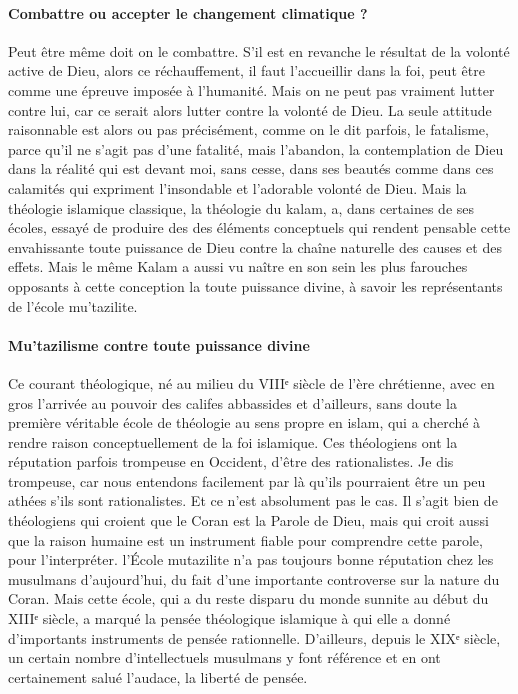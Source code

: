 \paragraph{Combattre ou accepter le changement climatique ?}
Peut être même doit on le combattre. S'il est en revanche le résultat de la volonté active de Dieu, alors ce réchauffement, il faut l'accueillir dans la foi, peut être comme une épreuve imposée à l'humanité. Mais on ne peut pas vraiment lutter contre lui, car ce serait alors lutter contre la volonté de Dieu. La seule attitude raisonnable est alors ou pas précisément, comme on le dit parfois, le fatalisme, parce qu'il ne s'agit pas d'une fatalité, mais l'abandon, la contemplation de Dieu dans la réalité qui est devant moi, sans cesse, dans ses beautés comme dans ces calamités qui expriment l'insondable et l'adorable volonté de Dieu.
Mais la théologie islamique classique, la théologie du kalam, a, dans certaines de ses écoles,  essayé de produire des des éléments conceptuels qui rendent pensable cette envahissante toute puissance de Dieu contre la chaîne naturelle des causes et des effets. Mais le même Kalam a aussi vu naître en son sein les plus farouches opposants à cette conception la toute puissance divine, à savoir les représentants de l'école mu'tazilite.

\paragraph{Mu'tazilisme contre toute puissance divine}
Ce courant théologique, né au milieu du VIIIᵉ siècle de l'ère chrétienne, avec en gros l'arrivée au pouvoir des califes abbassides et d'ailleurs, sans doute la première véritable école de théologie au sens propre en islam, qui a cherché à rendre raison conceptuellement de la foi islamique. Ces théologiens ont la réputation parfois trompeuse en Occident, d'être des rationalistes. Je dis trompeuse, car nous entendons facilement par là qu'ils pourraient être un peu athées s'ils sont rationalistes.
Et ce n'est absolument pas le cas. Il s'agit bien de théologiens qui croient que le Coran est la Parole de Dieu, mais qui croit aussi que la raison humaine est un instrument fiable pour comprendre cette parole, pour l'interpréter. l'École mutazilite n'a pas toujours bonne réputation chez les musulmans d'aujourd'hui, du fait d'une importante controverse sur la nature du Coran.
 Mais cette école, qui a du reste disparu du monde sunnite au début du XIIIᵉ siècle, a marqué la pensée théologique islamique à qui elle a donné d'importants instruments de pensée rationnelle. D'ailleurs, depuis le XIXᵉ siècle, un certain nombre d'intellectuels musulmans y font référence et en ont certainement salué l'audace, la liberté de pensée.

